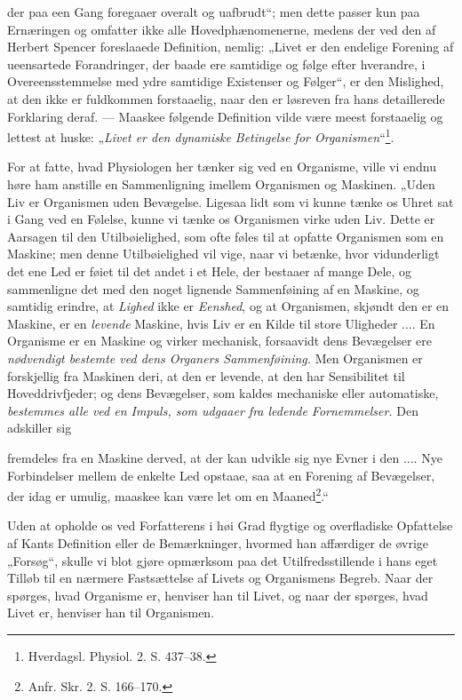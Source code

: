 \documentclass[12pt,a4paper]{book}
\begin{document}
\setcounter{footnote}{0}
der paa een Gang foregaaer overalt og uafbrudt“; men dette passer kun paa
Ernæringen og omfatter ikke alle Hovedphænomenerne, medens der ved den af
Herbert Spencer foreslaaede Definition, nemlig: „Livet er den endelige
Forening af ueensartede Forandringer, der baade ere samtidige og følge
efter hverandre, i Overeensstemmelse med ydre samtidige Existenser og
Følger“, er den Mislighed, at den ikke er fuldkommen forstaaelig, naar
den er løsreven fra hans detaillerede Forklaring deraf. --- Maaskee
følgende Definition vilde være meest forstaaelig og lettest at huske:
„\emph{Livet er den dynamiske Betingelse for
Organismen}“\footnote{Hverdagsl. Physiol. 2. S. 437--38.}.

For at fatte, hvad Physiologen her tænker sig ved en Organisme, ville vi
endnu høre ham anstille en Sammenligning imellem Organismen og Maskinen.
„Uden Liv er Organismen uden Bevægelse. Ligesaa lidt som vi kunne tænke
os Uhret sat i Gang ved en Følelse, kunne vi tænke os Organismen virke
uden Liv. Dette er Aarsagen til den Utilbøielighed, som ofte føles til at
opfatte Organismen som en Maskine; men denne Utilbøielighed vil vige,
naar vi betænke, hvor vidunderligt det ene Led er føiet til det andet i
et Hele, der bestaaer af mange Dele, og sammenligne det med den noget
lignende Sammenføining af en Maskine, og samtidig erindre, at
\emph{Lighed} ikke er \emph{Eenshed}, og at Organismen, skjøndt den er en
Maskine, er en \emph{levende} Maskine, hvis Liv er en Kilde til store
Uligheder .... En Organisme er en Maskine og virker mechanisk, forsaavidt
dens Bevægelser ere \emph{nødvendigt bestemte ved dens Organers
Sammenføining.} Men Organismen er forskjellig fra Maskinen deri, at den
er levende, at den har Sensibilitet til Hoveddrivfjeder; og dens
Bevægelser, som kaldes mechaniske eller automatiske, \emph{bestemmes alle
ved en Impuls, som udgaaer fra ledende Fornemmelser.} Den adskiller sig

\setcounter{footnote}{0}
fremdeles fra en Maskine derved, at der kan udvikle sig nye Evner i den
.... Nye Forbindelser mellem de enkelte Led opstaae, saa at en Forening
af Bevægelser, der idag er umulig, maaskee kan være let om en
Maaned\footnote{Anfr. Skr. 2. S. 166--170.}.“

Uden at opholde os ved Forfatterens i høi Grad flygtige og overfladiske
Opfattelse af Kants Definition eller de Bemærkninger, hvormed han
affærdiger de øvrige „Forsøg“, skulle vi blot gjøre opmærksom paa det
Utilfredsstillende i hans eget Tilløb til en nærmere Fastsættelse af
Livets og Organismens Begreb. Naar der spørges, hvad Organisme er,
henviser han til Livet, og naar der spørges, hvad Livet er, henviser han
til Organismen.
\end{document}
